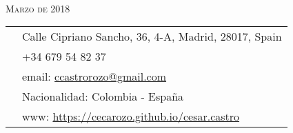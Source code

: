 \documentclass[11pt]{article}\usepackage[]{graphicx}\usepackage[]{color}
\begin{document}
\par{\\
\vspace{5pt}
{\color{headings} \scshape{Marzo de 2018}}\\
\vspace{10pt}}

\colorbox{shade}{{
\begin{tabular}{c|p{13cm}}
\vspace{5pt}\raisebox{-4pt}{\textifsymbol{18}} & Calle Cipriano Sancho, 36, 4-A, Madrid, 28017, Spain\\
\vspace{5pt}\raisebox{-4pt}{\Mobilefone} & +34 679 54 82 37\\
\vspace{5pt}\raisebox{-4pt}{\Letter} & email: \href{mailto:castrorozo@gmail.com}{ccastrorozo@gmail.com} \\
\vspace{5pt}\raisebox{-4pt}{\Aquarius} & Nacionalidad: Colombia - España\\
\vspace{5pt}\raisebox{-4pt}{\Mundus} & www: \href{https://cecarozo.github.io/cesar.castro}{https://cecarozo.github.io/cesar.castro}\\
\end{tabular}
}
}\\[10pt]



\end{document}
